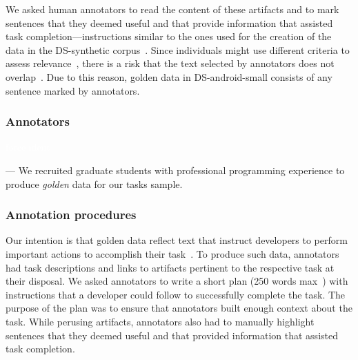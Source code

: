 We asked human annotators to read the content of these
artifacts and 
to mark sentences that they deemed useful and that provide information that assisted task completion---instructions similar to the ones used for the creation of the 
data in the \acs{DS-synthetic} corpus~\cite{marques2020}.
Since individuals might use different criteria to
assess relevance~\cite{Barry1994, Barry1998, Freund2015},
there is a risk that
the text selected by annotators does not overlap~\cite{Freund2013, Freund2015}.
Due to this reason, golden data in \acs{DS-android-small} consists of any sentence marked by annotators. 






\subsubsection{Annotators}
\textcolor{white}{force ident} %

--- We recruited  graduate students with professional programming experience to produce \textit{golden} data for our tasks sample. \vspace{3mm}


\subsubsection{Annotation procedures}

 


Our intention is that golden data reflect text that instruct developers to perform important actions to accomplish their task~\cite{Robillard2015, Lotufo2012}.
To produce such data, annotators had task descriptions and links to artifacts pertinent to the respective task at their disposal. We asked annotators to write a short plan (250 words max~\cite{Rastkar2010}) with instructions that a developer could follow to successfully complete the task. 
The purpose of the plan was to ensure that annotators built enough context about the task.
While perusing artifacts, annotators also had to manually highlight sentences that they deemed useful and that provided information that assisted task completion. 



